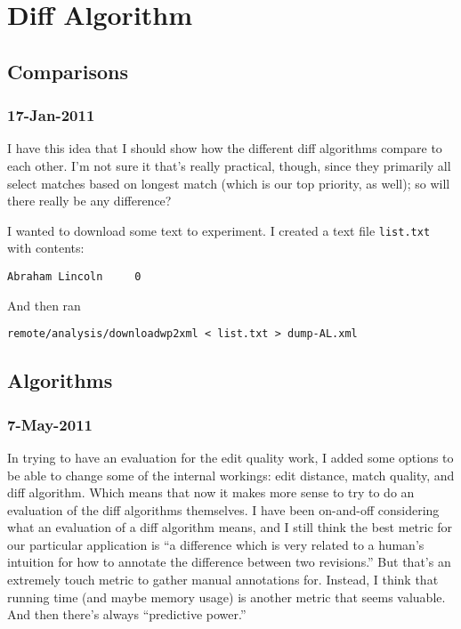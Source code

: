 \chapter{Diff Algorithm}

\section{Comparisons}

\subsection{17-Jan-2011}

I have this idea that I should show how the different
diff algorithms compare to each other.
I'm not sure it that's really practical, though, since
they primarily all select matches based on longest match
(which is our top priority, as well); so will there really be
any difference?

I wanted to download some text to experiment.
I created a text file \texttt{list.txt} with contents:
\begin{verbatim}
Abraham Lincoln     0
\end{verbatim}
And then ran
\begin{verbatim}
remote/analysis/downloadwp2xml < list.txt > dump-AL.xml
\end{verbatim}

\section{Algorithms}

\subsection{7-May-2011}

In trying to have an evaluation for the edit quality work,
I added some options to be able to change some of the internal workings:
edit distance, match quality, and diff algorithm.
Which means that now it makes more sense to try to do an evaluation
of the diff algorithms themselves.
I have been on-and-off considering what an evaluation of a diff algorithm
means, and I still think the best metric for our particular application
is ``a difference which is very related to a human's intuition for
how to annotate the difference between two revisions.''
But that's an extremely touch metric to gather manual annotations for.
Instead, I think that running time (and maybe memory usage) is another
metric that seems valuable.
And then there's always ``predictive power.''

